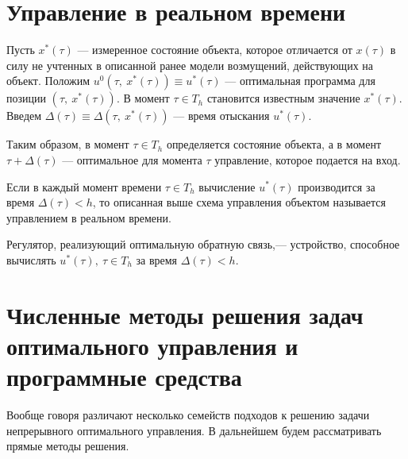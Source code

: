 \section{Управление в реальном времени}\label{1_3}


Пусть $x^*(\tau)$ --- измеренное состояние объекта, которое отличается от $x(\tau)$ в силу не учтенных в описанной ранее модели возмущений, действующих на объект. Положим $u^0(\tau, ~x^*(\tau)) \equiv u^*(\tau)$ --- оптимальная программа для позиции $(\tau, ~x^*(\tau))$. В момент $\tau \in T_h$ становится известным значение $x^*(\tau)$. Введем $\Delta(\tau) \equiv \Delta(\tau, ~x^*(\tau))$ --- время отыскания $u^*(\tau)$.


Таким образом, в момент $\tau \in T_h$ определяется состояние объекта, а в момент $\tau + \Delta(\tau)$ --- оптимальное для момента $\tau$ управление, которое подается на вход.


\begin{definition}  Если в каждый момент времени $\tau \in T_h$ вычисление $u^*(\tau)$ производится за время $\Delta(\tau) < h$, то описанная выше схема управления объектом называется управлением в реальном времени. 
\end{definition}


\begin{definition}   Регулятор, реализующий оптимальную обратную связь,--- устройство, способное вычислять $u^*(\tau),	 ~\tau \in T_h$ за время $\Delta(\tau) < h$.
\end{definition}




\section{Численные методы решения задач оптимального управления и программные средства}


Вообще говоря различают несколько семейств подходов к решению задачи непрерывного оптимального управления. В дальнейшем будем рассматривать прямые методы решения. 


